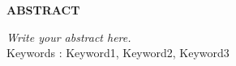 \begin{center}
\thispagestyle{empty}
\vspace*{4\baselineskip}
\LARGE{\textbf{ABSTRACT}}\\[1.0cm]
\end{center}
\thispagestyle{empty}
\large{\emph{Write your abstract here.\\[1cm]}}
Keywords : Keyword1, Keyword2, Keyword3